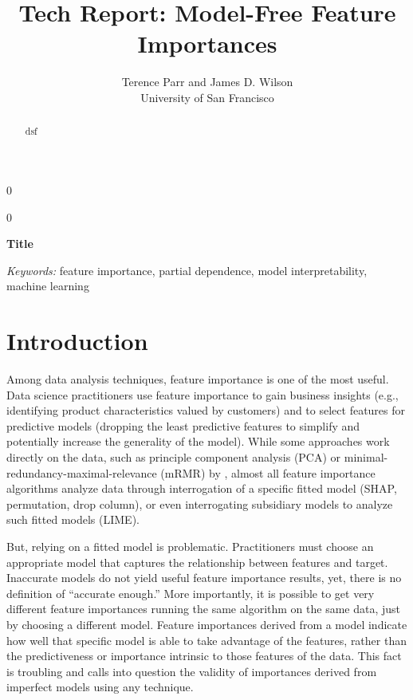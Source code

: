 \documentclass[12pt]{article}
\newcommand{\blind}{0}
\newcommand{\todo}[1]{{{\color{red}{[#1]}}}}
\begin{document}
\def\spacingset#1{\renewcommand{\baselinestretch}%
{#1}\small\normalsize} \spacingset{1}



\blind
{
  \title{\bf Tech Report: Model-Free Feature Importances}

  \author{Terence Parr and James D. Wilson\\
      University of San Francisco\\
}
  \maketitle
} \fi

\blind
{
  \bigskip
  \bigskip
  \bigskip
  \begin{center}
    {\LARGE\bf Title}
\end{center}
  \medskip
} \fi

\bigskip
\begin{abstract}
dsf
\end{abstract}

\noindent%
{\it Keywords:} feature importance, partial dependence, model interpretability, machine learning

\section{Introduction}
\label{sec:intro}

\todo{wrapper vs filter methods}

Among data analysis techniques, feature importance is one of the most  useful. Data science practitioners use feature importance to gain business insights (e.g., identifying product characteristics valued by customers) and to select features for predictive models (dropping the least predictive features to simplify and potentially increase the generality of the model). While some approaches work directly on the data, such as principle component analysis (PCA) or minimal-redundancy-maximal-relevance (mRMR) by \cite{mRMR}, almost all feature importance algorithms analyze data through interrogation of a specific  fitted model (SHAP, permutation, drop column), or even interrogating subsidiary models to analyze such fitted models (LIME).

But, relying on a fitted model is problematic. Practitioners must choose an appropriate model that captures the relationship between features and target. Inaccurate models do not yield useful feature importance results, yet, there is no definition of ``accurate enough.'' More importantly, it is possible to get very different feature importances running the same algorithm on the same data, just by choosing a different model. Feature importances derived from a model indicate how well that specific model is able to take advantage of the features, rather than the predictiveness or importance intrinsic to those features of the data.  This fact is troubling and calls into question the validity of importances derived from imperfect models using any technique.  
\end{document}
